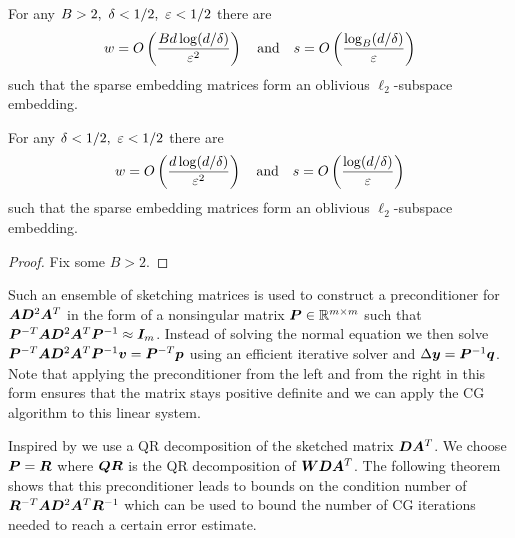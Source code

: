 \begin{theorem}  \label{thm:sparse-ose}
For any \(B > 2, \ \delta < 1/2, \ \varepsilon < 1/2\) there are
\[ w = O \left( \frac{B d \log(d/\delta)}{\varepsilon^2} \right) \quad \text{and} \quad s = O \left( \frac{\log_B(d/\delta)}{\varepsilon} \right)\]
such that the sparse embedding matrices form an oblivious \(\ell_2\)-subspace embedding.
\end{theorem}

\begin{corollary}
For any \(\delta < 1/2, \ \varepsilon < 1/2\) there are
\[ w = O \left( \frac{d \log(d/\delta)}{\varepsilon^2} \right) \quad \text{and} \quad s = O \left( \frac{\log(d/\delta)}{\varepsilon} \right)\]
such that the sparse embedding matrices form an oblivious \(\ell_2\)-subspace embedding.
\end{corollary}
\begin{proof}
Fix some \(B > 2\).
\end{proof}

Such an ensemble of sketching matrices is used to construct a preconditioner for \(\bm{A} \bm{D}^2 \bm{A}^T\) in the form of a nonsingular matrix \(\bm{P} \in \mathbb{R}^{m \times m}\) such that
\( \bm{P}^{-T} \bm{A} \bm{D}^2 \bm{A}^T \bm{P}^{-1} \approx \bm{I}_m \).
Instead of solving the normal equation we then solve
\( \bm{P}^{-T} \bm{A} \bm{D}^2 \bm{A}^T \bm{P}^{-1} \bm{v} = \bm{P}^{-T} \bm{p} \)
using an efficient iterative solver and \(\Delta\bm{y} = \bm{P}^{-1} \bm{q}\).
Note that applying the preconditioner from the left and from the right in this form ensures that the matrix stays positive definite and we can apply the CG algorithm to this linear system.

Inspired by \textcite{Avron-FasterRandomizedInfeasibleIPMs} we use a QR decomposition of the sketched matrix \(\bm{D}\bm{A}^T\).
We choose \(\bm{P} = \bm{R}\) where \(\bm{Q}\bm{R}\) is the QR decomposition of \(\bm{W}\bm{D}\bm{A}^T\).
The following theorem shows that this preconditioner leads to bounds on the condition number of \(\bm{R}^{-T} \bm{A} \bm{D}^2 \bm{A}^T \bm{R}^{-1}\) which can be used to bound the number of CG iterations needed to reach a certain error estimate.

